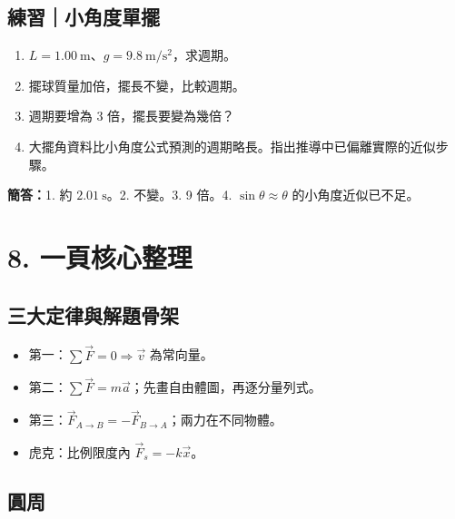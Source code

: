 \documentclass[11pt,a4paper]{article}
\providecommand{\tightlist}{%
  \setlength{\itemsep}{0pt}\setlength{\parskip}{0pt}}
\begin{document}
\begin{HandoutSelfCheck}

\subsection{練習｜小角度單擺}\label{ux7df4ux7fd2ux5c0fux89d2ux5ea6ux55aeux64fa}

\begin{enumerate}
\def\labelenumi{\arabic{enumi}.}
\tightlist
\item
  \(L=1.00\ \mathrm m\)、\(g=9.8\ \mathrm{m/s^2}\)，求週期。
\item
  擺球質量加倍，擺長不變，比較週期。
\item
  週期要增為 3 倍，擺長要變為幾倍？
\item
  大擺角資料比小角度公式預測的週期略長。指出推導中已偏離實際的近似步驟。
\end{enumerate}

\textbf{簡答：}1. 約 \(2.01\ \mathrm s\)。2. 不變。3. 9 倍。4. \(\sin\theta\approx\theta\) 的小角度近似已不足。

\end{HandoutSelfCheck}

\section{8. 一頁核心整理}\label{ux4e00ux9801ux6838ux5fc3ux6574ux7406}

\subsection{三大定律與解題骨架}\label{ux4e09ux5927ux5b9aux5f8bux8207ux89e3ux984cux9aa8ux67b6}

\begin{itemize}
\tightlist
\item
  第一：\(\sum\vec F=0\Rightarrow\vec v\) 為常向量。
\item
  第二：\(\sum\vec F=m\vec a\)；先畫自由體圖，再逐分量列式。
\item
  第三：\(\vec F_{A\to B}=-\vec F_{B\to A}\)；兩力在不同物體。
\item
  虎克：比例限度內 \(\vec F_s=-k\vec x\)。
\end{itemize}

\subsection{圓周}\label{ux5713ux5468}
\end{document}
